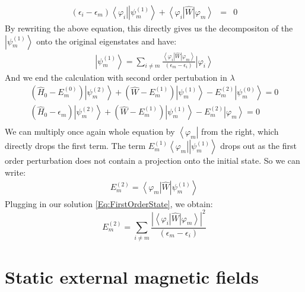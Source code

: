 \documentclass[10pt]{article}
\newcommand{\bra}[1]{\ensuremath{\left\langle#1\right|}}
\newcommand{\ket}[1]{\ensuremath{\left|#1\right\rangle}}
\newcommand{\Hzero}{\hat{H}_0}
\newcommand{\Wop}{\hat{W}}
\begin{document}
\begin{eqnarray}
(\epsilon_i-\epsilon_m)\bra{\varphi_i}\ket{\psi_m^{(1)}}+\bra{\varphi_i}\Wop\ket{\varphi_m} &=& 0
\end{eqnarray}
By rewriting the above equation, this directly gives us the decompositon of the $\ket{\psi_m^{(1)}}$ onto the original eigenstates and have:
\begin{eqnarray}\label{Eq:FirstOrderState}
\boxed{\ket{\psi_m^{(1)}} = \sum_{i\neq m} \frac{\bra{\varphi_i}\Wop\ket{\varphi_m}}{(\epsilon_m-\epsilon_i)}\ket{\varphi_i}}
\end{eqnarray}
And we end the calculation with second order pertubation in $\lambda$
\begin{eqnarray}
(\Hzero-E_m^{(0)}) \ket{\psi_m^{(2)}} + (\Wop-E_m^{(1)})\ket{\psi_m^{(1)}}-E_m^{(2)} \ket{\psi_m^{(0)}}= 0\\
(\Hzero-\epsilon_m) \ket{\psi_m^{(2)}} + (\Wop-E_m^{(1)})\ket{\psi_m^{(1)}}-E_m^{(2)} \ket{\varphi_m}= 0\\
\end{eqnarray}
We can multiply once again whole equation by $\bra{\varphi_m}$ from the right, which directly drops the first term. The term $E_m^{(1)}\bra{\varphi_m}\ket{\psi_m^{(1)}}$ drops out as the first order perturbation does not contain a projection onto the initial state. So we can write:
\begin{eqnarray}
E_m^{(2)}= \bra{\varphi_m}\Wop\ket{\psi_m^{(1)}}
\end{eqnarray}
Plugging in our solution \eqref{Eq:FirstOrderState}, we obtain:
\begin{equation}\label{Eq:PerturbSecOrder}
\boxed{E_m^{(2)} = \sum_{i\neq m} \frac{|\bra{\varphi_i}\Wop\ket{\varphi_m}|^2}{(\epsilon_m-\epsilon_i)}}
\end{equation}

\section{Static external magnetic fields}
\end{document}
